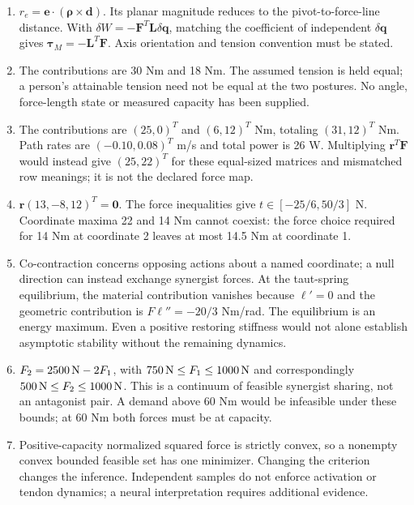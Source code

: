 \begin{enumerate}
\item $r_e=\bm e\cdot(\bm\rho\times\bm d)$. Its planar magnitude reduces to the pivot-to-force-line distance. With $\delta W=-\bm F^T\bm L\delta\bm q$, matching the coefficient of independent $\delta\bm q$ gives $\bm\tau_M=-\bm L^T\bm F$. Axis orientation and tension convention must be stated.

\item The contributions are 30 Nm and 18 Nm. The assumed tension is held equal; a person's attainable tension need not be equal at the two postures. No angle, force-length state or measured capacity has been supplied.

\item The contributions are $(25,0)^T$ and $(6,12)^T$ Nm, totaling $(31,12)^T$ Nm. Path rates are $(-0.10,0.08)^T$ m/s and total power is 26 W. Multiplying $\bm r^T\bm F$ would instead give $(25,22)^T$ for these equal-sized matrices and mismatched row meanings; it is not the declared force map.

\item $\bm r(13,-8,12)^T=\bm0$. The force inequalities give $t\in[-25/6,50/3]$ N. Coordinate maxima 22 and 14 Nm cannot coexist: the force choice required for 14 Nm at coordinate 2 leaves at most 14.5 Nm at coordinate 1.

\item Co-contraction concerns opposing actions about a named coordinate; a null direction can instead exchange synergist forces. At the taut-spring equilibrium, the material contribution vanishes because $\ell'=0$ and the geometric contribution is $F\ell''=-20/3$ Nm/rad. The equilibrium is an energy maximum. Even a positive restoring stiffness would not alone establish asymptotic stability without the remaining dynamics.

\item $F_2=2500\,{\rm N}-2F_1$, with $750\,{\rm N}\leq F_1\leq1000\,{\rm N}$ and correspondingly $500\,{\rm N}\leq F_2\leq1000\,{\rm N}$. This is a continuum of feasible synergist sharing, not an antagonist pair. A demand above 60 Nm would be infeasible under these bounds; at 60 Nm both forces must be at capacity.

\item Positive-capacity normalized squared force is strictly convex, so a nonempty convex bounded feasible set has one minimizer. Changing the criterion changes the inference. Independent samples do not enforce activation or tendon dynamics; a neural interpretation requires additional evidence.


\end{enumerate}
